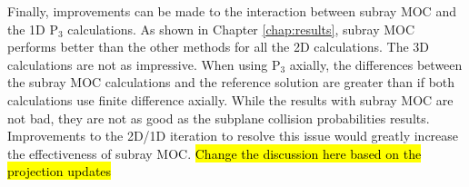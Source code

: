 Finally, improvements can be made to the interaction between subray MOC and the 1D P$_3$ calculations.  As shown in Chapter \ref{chap:results}, subray MOC performs better than the other methods for all the 2D calculations.  The 3D calculations are not as impressive.  When using P$_3$ axially, the differences between the subray MOC calculations and the reference solution are greater than if both calculations use finite difference axially.  While the results with subray MOC are not bad, they are not as good as the subplane collision probabilities results.  Improvements to the 2D/1D iteration to resolve this issue would greatly increase the effectiveness of subray MOC. \hl{Change the discussion here based on the projection updates}